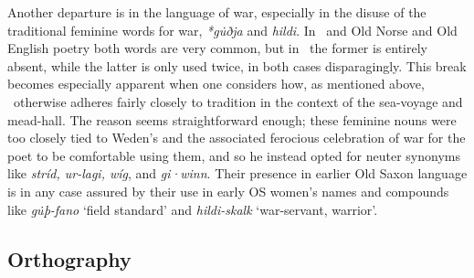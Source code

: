 Another departure is in the language of war, especially in the disuse of the traditional feminine words for war, \emph{*gu̇ðja} and \emph{hildi}.  In \Hildebrandslied\ and Old Norse and Old English poetry both words are very common, but in \Heliand\ the former is entirely absent, while the latter is only used twice, in both cases disparagingly.  This break becomes especially apparent when one considers how, as mentioned above, \Heliand\ otherwise adheres fairly closely to tradition in the context of the sea-voyage and mead-hall.  The reason seems straightforward enough; these feminine nouns were too closely tied to Weden’s  and the associated ferocious celebration of war for the poet to be comfortable using them, and so he instead opted for neuter synonyms like \emph{stríd, ur-lagi, wíg}, and \emph{gi·winn}.  Their presence in earlier Old Saxon language is in any case assured by their use in early OS women’s names and compounds like \emph{gu̇þ-fano} ‘field standard’ and \emph{hildi-skalk} ‘war-servant, warrior’.

\subsection{Orthography}

